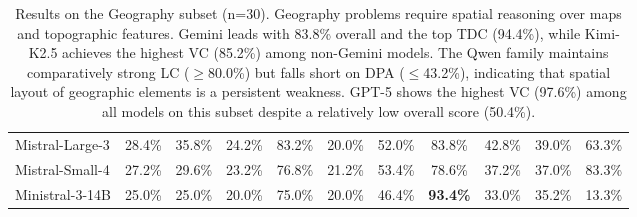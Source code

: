 \documentclass[11pt]{article}
\begin{document}
\begin{table}[!ht]
{\begin{tabular}{lcccc|cccc|cc}
Mistral-Large-3        & 28.4\% & 35.8\% & 24.2\% & 83.2\% & 20.0\% & 52.0\% & 83.8\% & 42.8\% & 39.0\% & 63.3\% \\
Mistral-Small-4        & 27.2\% & 29.6\% & 23.2\% & 76.8\% & 21.2\% & 53.4\% & 78.6\% & 37.2\% & 37.0\% & 83.3\% \\
Ministral-3-14B        & 25.0\% & 25.0\% & 20.0\% & 75.0\% & 20.0\% & 46.4\% & \textbf{93.4\%} & 33.0\% & 35.2\% & 13.3\% \\
\bottomrule
\end{tabular}}
\caption{Results on the Geography subset (n=30). Geography problems require spatial reasoning over maps and topographic features. Gemini leads with 83.8\% overall and the top TDC (94.4\%), while Kimi-K2.5 achieves the highest VC (85.2\%) among non-Gemini models. The Qwen family maintains comparatively strong LC ($\geq$80.0\%) but falls short on DPA ($\leq$43.2\%), indicating that spatial layout of geographic elements is a persistent weakness. GPT-5 shows the highest VC (97.6\%) among all models on this subset despite a relatively low overall score (50.4\%).}
\label{tab:results-geography}
\end{table}
\end{document}

